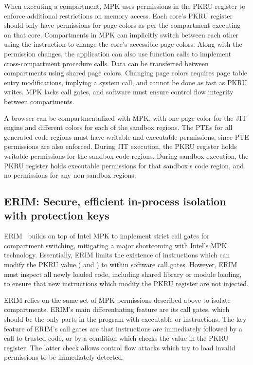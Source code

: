 When executing a compartment, MPK uses permissions in the PKRU register
to enforce additional restrictions on memory access. 
Each core's PKRU register should only have permissions for page colors as
per the compartment executing on that core.
Compartments in MPK can implicitly switch between each other using the 
 instruction to change the core's accessible page colors.
Along with the permission changes, the application can also use 
function calls to implement cross-compartment procedure calls.
Data can be transferred between compartments using shared page colors.
Changing page colors requires page table entry modifications, implying a
system call, and cannot be done as fast as PKRU writes.
MPK lacks call gates, and software must ensure control flow integrity
between compartments.

A browser can be compartmentalized with MPK, with one page color for the JIT
engine and different colors for each of the sandbox regions.
The PTEs for all generated code regions must have writable and executable
permissions, since PTE permissions are also enforced.
During JIT execution, the PKRU register holds writable permissions for the
sandbox code regions.
During sandbox execution, the PKRU register holds executable permissions for 
that sandbox's code region, and no permissions for any non-sandbox regions.

\subsection{ERIM: Secure, efficient in-process isolation with protection keys}
ERIM~\cite{ERIMOberwagner19} builds on top of Intel MPK to implement 
strict call gates for compartment switching, mitigating a major
shortcoming with Intel's MPK technology.
Essentially, ERIM limits the existence of instructions which can
modify the PKRU value ( and ) to within
software call gates.
However, ERIM must inspect all newly loaded code, including shared
library or module loading, to ensure that new instructions which
modify the PKRU register are not injected.

ERIM relies on the same set of MPK permissions described above to
isolate compartments.
ERIM's main differentiating feature are its call gates, which should
be the only parts in the program with executable  or
 instructions.
The key feature of ERIM's call gates are that  instructions
are immediately followed by a call to trusted code, or by a condition which
checks the value in the PKRU register. 
The latter check allows control flow attacks which try to load invalid
permissions to be immediately detected.

